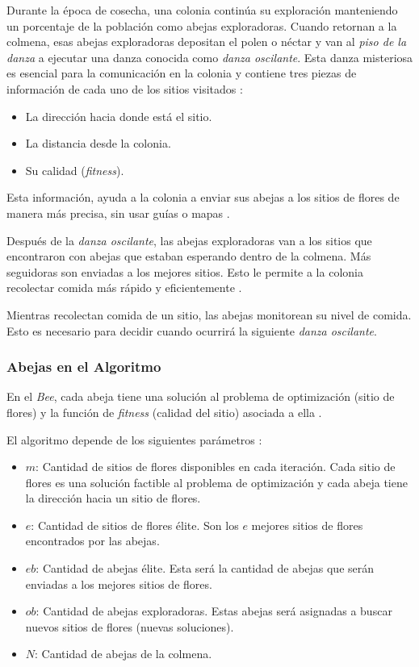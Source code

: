     Durante la época de cosecha, una colonia continúa su exploración
manteniendo un porcentaje de la población como abejas exploradoras.
Cuando retornan a la colmena, esas abejas exploradoras depositan el
polen o néctar y van al \emph{piso de la danza} a ejecutar una danza
conocida como \emph{danza oscilante}. Esta danza misteriosa es esencial
para la comunicación en la colonia y contiene tres piezas de información
de cada uno de los sitios visitados \cite{BEE_0}: 
\begin{itemize}
    \item La dirección hacia donde está el sitio.
    \item La distancia desde la colonia.
    \item Su calidad (\emph{fitness}).
\end{itemize}
    Esta información, ayuda a la colonia a enviar sus abejas a los sitios de
flores de manera más precisa, sin usar guías o mapas \cite{BEE_0}.

    Después de la \emph{danza oscilante}, las abejas exploradoras van a los
sitios que encontraron con abejas que estaban esperando dentro de la colmena.
Más seguidoras son enviadas a los mejores sitios. Esto le permite a la colonia
recolectar comida más rápido y eficientemente \cite{BEE_0}.

    Mientras recolectan comida de un sitio, las abejas monitorean su nivel de
comida. Esto es necesario para decidir cuando ocurrirá la siguiente
\emph{danza oscilante}\cite{BEE_0}.

\subsubsection{Abejas en el Algoritmo}

    En el \emph{Bee}, cada abeja tiene una solución al problema de optimización
(sitio de flores) y la función de \emph{fitness} (calidad del sitio) asociada a
ella \cite{BEE_0}.

    El algoritmo depende de los siguientes parámetros \cite{BEE_0}:
\begin{itemize}
    \item $m$: Cantidad de sitios de flores disponibles en cada iteración.
Cada sitio de flores es una solución factible al problema de optimización y
cada abeja tiene la dirección hacia un sitio de flores.
    \item $e$: Cantidad de sitios de flores élite. Son los $e$ mejores sitios de
flores encontrados por las abejas.
    \item $eb$: Cantidad de abejas élite. Esta será la cantidad de abejas que
serán enviadas a los mejores sitios de flores.
    \item $ob$: Cantidad de abejas exploradoras. Estas abejas será asignadas a
buscar nuevos sitios de flores (nuevas soluciones).
    \item $N$: Cantidad de abejas de la colmena.
\end{itemize}

